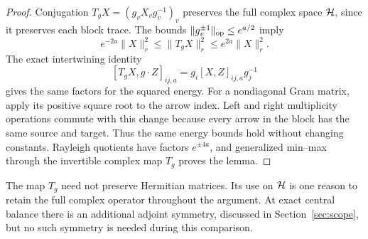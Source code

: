 \begin{proof}
Conjugation $T_gX=(g_vX_vg_v^{-1})_v$ preserves the full complex
space $\mathcal H$, since it preserves each block trace. The bounds
$\|g_v^{\pm1}\|_{\mathrm{op}}\le e^{a/2}$ imply
\begin{equation}\label{eq:gaugemass}
e^{-2a}\|X\|_r^2\le\|T_gX\|_r^2\le e^{2a}\|X\|_r^2.
\end{equation}
The exact intertwining identity
\[
[T_gX,g\cdot Z]_{ij,a}=g_i[X,Z]_{ij,a}g_j^{-1}
\]
gives the same factors for the squared energy. For a nondiagonal
Gram matrix, apply its positive square root to the arrow index.
Left and right multiplicity operations commute with this change
because every arrow in the block has the same source and target.
Thus the same energy bounds hold without changing constants.
Rayleigh quotients have factors $e^{\pm4a}$, and generalized
min--max through the invertible complex map $T_g$ proves the lemma.
\end{proof}

The map $T_g$ need not preserve Hermitian matrices. Its use on
$\mathcal H$ is one reason to retain the full complex operator throughout
the argument. At exact central balance there is an additional
adjoint symmetry, discussed in Section~\ref{sec:scope}, but no
such symmetry is needed during this comparison.

